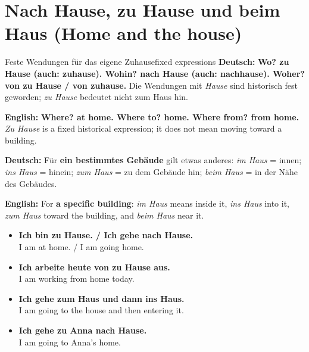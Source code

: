 \documentclass[a4paper,11pt]{article}
\newcommand{\GermanText}[1]{\textbf{Deutsch: }#1\par}
\newcommand{\EnglishText}[1]{{\small\color{SoftGray}\textbf{English: }#1\par}}
\newcommand{\ExampleItem}[2]{\item \textbf{#1}\\{\small\color{SoftGray}#2}}
\begin{document}
\section{Nach Hause, zu Hause und beim Haus (Home and the house)}
\begin{grammarentry}{Feste Wendungen für das eigene Zuhause}{fixed expressions}
\GermanText{\textbf{Wo? zu Hause (auch: zuhause). Wohin? nach Hause (auch: nachhause). Woher? von zu Hause / von zuhause.} Die Wendungen mit \emph{Hause} sind historisch fest geworden; \emph{zu Hause} bedeutet nicht \glqq zum Haus hin\grqq{}.}
\EnglishText{\textbf{Where? at home. Where to? home. Where from? from home.} \emph{Zu Hause} is a fixed historical expression; it does not mean moving toward a building.}
\GermanText{Für \textbf{ein bestimmtes Gebäude} gilt etwas anderes: \emph{im Haus} = innen; \emph{ins Haus} = hinein; \emph{zum Haus} = zu dem Gebäude hin; \emph{beim Haus} = in der Nähe des Gebäudes.}
\EnglishText{For \textbf{a specific building}: \emph{im Haus} means inside it, \emph{ins Haus} into it, \emph{zum Haus} toward the building, and \emph{beim Haus} near it.}
\end{grammarentry}
\begin{exbox}\begin{itemize}
\ExampleItem{Ich bin zu Hause. / Ich gehe nach Hause.}{I am at home. / I am going home.}
\ExampleItem{Ich arbeite heute von zu Hause aus.}{I am working from home today.}
\ExampleItem{Ich gehe zum Haus und dann ins Haus.}{I am going to the house and then entering it.}
\ExampleItem{Ich gehe zu Anna nach Hause.}{I am going to Anna's home.}
\end{itemize}\end{exbox}
\end{document}
